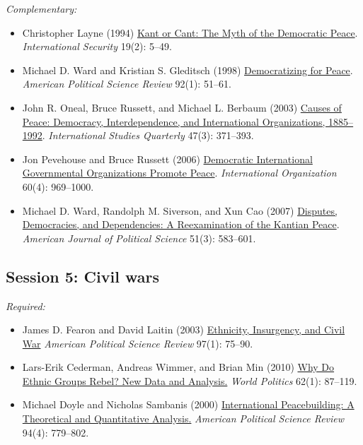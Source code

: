 \documentclass[12pt, a4paper]{article}
\begin{document}
\newpage
\noindent\textit{Complementary:}

\begin{itemize}
	\item Christopher Layne (1994) \href{https://doi.org/10.2307/2539195}{Kant or Cant: The Myth of the Democratic Peace}. \textit{International Security} 19(2): 5--49.
  \item Michael D. Ward and Kristian S. Gleditsch (1998) \href{https://doi.org/10.2307/2585928}{Democratizing for Peace}. \textit{American Political Science Review} 92(1): 51--61.
	\item John R. Oneal, Bruce Russett, and Michael L. Berbaum (2003) \href{https://doi.org/10.1111/1468-2478.4703004}{Causes of Peace: Democracy, Interdependence, and International Organizations, 1885–1992}. \textit{International Studies Quarterly} 47(3): 371--393.
	\item Jon Pevehouse and Bruce Russett (2006) \href{https://doi.org/10.1017/S0020818306060322}{Democratic International Governmental Organizations Promote Peace}. \textit{International Organization} 60(4): 969--1000.
  \item Michael D. Ward, Randolph M. Siverson, and Xun Cao (2007) \href{https://doi.org/10.1111/j.1540-5907.2007.00269.x}{Disputes, Democracies, and Dependencies: A Reexamination of the Kantian Peace}. \textit{American Journal of Political Science} 51(3): 583--601.
\end{itemize}


\vspace{20pt}
\hline
\subsection*{Session 5: Civil wars}

\noindent\textit{Required:}

\begin{itemize}
  \item James D. Fearon and David Laitin (2003) \href{https://doi.org/10.1017/S0003055403000534}{Ethnicity, Insurgency, and Civil War} \textit{American Political Science Review} 97(1): 75--90.
  \item Lars-Erik Cederman, Andreas Wimmer, and Brian Min (2010) \href{https://doi.org/10.1017/S0043887109990219}{Why Do Ethnic Groups Rebel? New Data and Analysis.} \textit{World Politics} 62(1): 87--119.
  \item Michael Doyle and Nicholas Sambanis (2000) \href{https://doi.org/10.2307/2586208}{International Peacebuilding: A Theoretical and Quantitative Analysis.} \textit{American Political Science Review} 94(4): 779--802.
\end{itemize}
\end{document}
